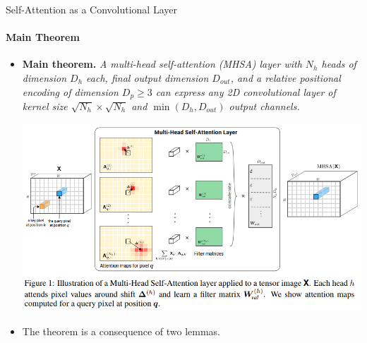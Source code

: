 \documentclass[9pt]{beamer}
\begin{document}
\begin{frame}{Self-Attention as a Convolutional Layer}
\framesubtitle{Main Theorem}
\begin{itemize}
\item \textbf{Main theorem.} \emph{A {\em multi-head self-attention} (MHSA) layer with $N_h$ heads of dimension $D_h$ each, final output dimension $D_{out}$, and a {\em relative positional encoding} of dimension $D_p\geq3$ can express any 2D convolutional layer of kernel size $\sqrt{N_h}\times\sqrt{N_h}$ and $\min(D_h, D_{out})$ output channels.}

\begin{center}
    \includegraphics[width=.8\textwidth]{presentation/images/sa_as_conv.png}
\end{center}
\vspace{-.1in}

\item The theorem is a consequence of two lemmas.

\end{itemize}
\end{frame}
\end{document}
